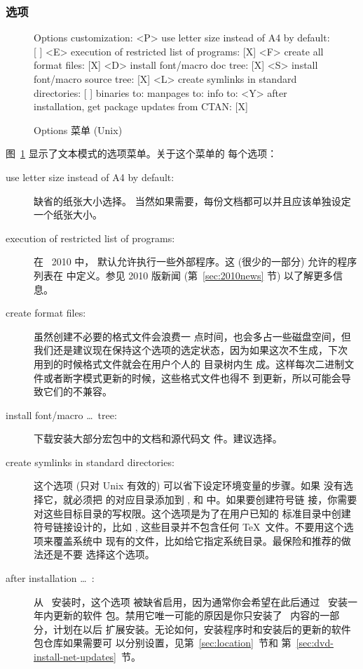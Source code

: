 \documentclass{article}
\begin{document}
\subsubsection{选项}
\label{sec:options}

\begin{figure}[tbh]
\begin{boxedverbatim}
Options customization:
 <P> use letter size instead of A4 by default: [ ]
 <E> execution of restricted list of programs: [X]
 <F> create all format files:                  [X]
 <D> install font/macro doc tree:              [X]
 <S> install font/macro source tree:           [X]
 <L> create symlinks in standard directories:  [ ]
            binaries to:
            manpages to:
                info to:
 <Y> after installation, get package updates from CTAN: [X]
\end{boxedverbatim}
\caption{Options 菜单 (Unix)}\label{fig:options-text}
\end{figure}

图~\ref{fig:options-text} 显示了文本模式的选项菜单。关于这个菜单的
每个选项：

\begin{description}
\item[use letter size instead of A4 by default:] 缺省的纸张大小选择。
当然如果需要，每份文档都可以并且应该单独设定一个纸张大小。

\item[execution of restricted list of programs:] 在 \TL\ 2010 中，
默认允许执行一些外部程序。这 (很少的一部分) 允许的程序列表在
 中定义。参见 2010 版新闻 (第~\ref{sec:2010news} 节)
以了解更多信息。

\item[create format files:] 虽然创建不必要的格式文件会浪费一
点时间，也会多占一些磁盘空间，但
我们还是建议现在保持这个选项的选定状态，因为如果这次不生成，下次
用到的时候格式文件就会在用户个人的  目录树内生
成。这样每次二进制文件或者断字模式更新的时候，这些格式文件也得不
到更新，所以可能会导致它们的不兼容。

\item[install font/macro \ldots\ tree:] 下载安装大部分宏包中的文档和源代码文
件。建议选择。

\item[create symlinks in standard directories:]
这个选项 (只对 Unix 有效的) 可以省下设定环境变量的步骤。如果
没有选择它，就必须把 \TL{} 的对应目录添加到 ,
 和  中。如果要创建符号链
接，你需要对这些目标目录的写权限。这个选项是为了在用户已知的
标准目录中创建符号链接设计的，比如 ,
这些目录并不包含任何 \TeX\ 文件。不要用这个选项来覆盖系统中
现有的文件，比如给它指定系统目录。最保险和推荐的做法还是不要
选择这个选项。

\item[after installation \ldots\ \CTAN:] 从 \DVD\ 安装时，这个选项
被缺省启用，因为通常你会希望在此后通过 \CTAN\ 安装一年内更新的软件
包。禁用它唯一可能的原因是你只安装了 \DVD\ 内容的一部分，计划在以后
扩展安装。无论如何，安装程序时和安装后的更新的软件包仓库如果需要可
以分别设置，见第~\ref{sec:location}~节和
第~\ref{sec:dvd-install-net-updates}~节。
\end{description}
\end{document}
